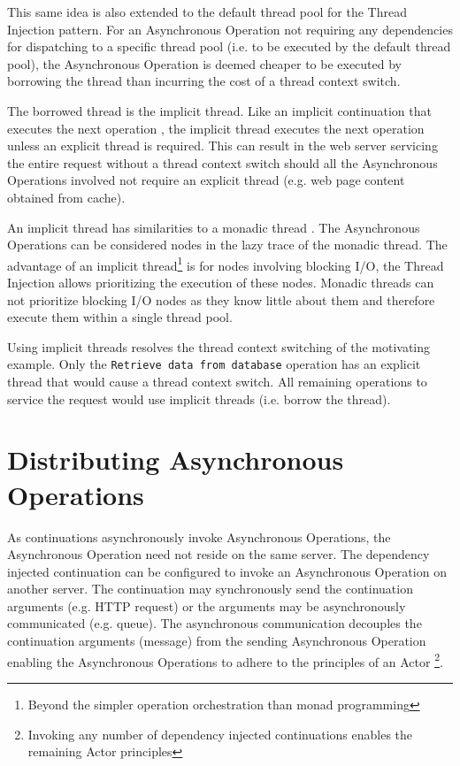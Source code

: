 \documentclass[prodmode]{style/acmlarge}
\begin{document}
This same idea is also extended to the default thread pool for the Thread
Injection pattern.  For an Asynchronous Operation not requiring any dependencies
for dispatching to a specific thread pool (i.e. to be executed by the default
thread pool), the Asynchronous Operation is deemed cheaper to be executed by
borrowing the thread than incurring the cost of a thread context switch.

The borrowed thread is the implicit thread.  Like an implicit continuation that
executes the next operation \cite{continuations}, the implicit thread executes
the next operation unless an explicit thread is required.  This can result in
the web server servicing the entire request without a thread context switch
should all the Asynchronous Operations involved not require an explicit thread
(e.g. web page content obtained from cache).

An implicit thread has similarities to a monadic thread \cite{monadic-thread}.
The Asynchronous Operations can be considered nodes in the lazy trace of the
monadic thread.  The advantage of an implicit thread\footnote{Beyond the simpler
operation orchestration than monad programming} is for nodes involving blocking
I/O, the Thread Injection allows prioritizing the execution of these nodes. 
Monadic threads can not prioritize blocking I/O nodes as they know little about
them and therefore execute them within a single thread pool.

Using implicit threads resolves the thread context switching of the motivating
example.  Only the \texttt{Retrieve data from database} operation has an
explicit thread that would cause a thread context switch.  All remaining
operations to service the request would use implicit threads (i.e. borrow the
thread).


\section{Distributing Asynchronous Operations}

As continuations asynchronously invoke Asynchronous Operations, the Asynchronous
Operation need not reside on the same server.  The dependency injected
continuation can be configured to invoke an Asynchronous Operation on another
server.  The continuation may synchronously send the continuation arguments
(e.g. HTTP request) or the arguments may be asynchronously communicated (e.g.
queue).  The asynchronous communication decouples the continuation arguments
(message) from the sending Asynchronous Operation enabling the Asynchronous
Operations to adhere to the principles of an Actor
\cite{actors}\footnote{Invoking any number of dependency injected continuations
enables the remaining Actor principles}.
\end{document}
